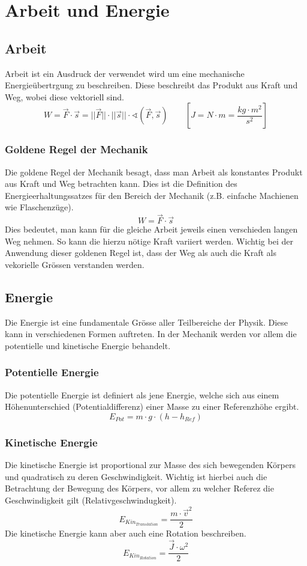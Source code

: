 \chapter{Arbeit und Energie}

\section{Arbeit}
Arbeit ist ein Ausdruck der verwendet wird um eine mechanische 
Energieübertrgung zu beschreiben. Diese beschreibt das Produkt aus
Kraft und Weg, wobei diese vektoriell sind.
\[ \boxed{ W = \vec{F} \cdot \vec{s} 
	= ||\vec{F}|| \cdot ||\vec{s}|| \cdot 
	\sphericalangle \left( \vec{F}, \vec{s} \right) } 
	\qquad \left[ J = N \cdot m = \frac{kg \cdot m^2}{s^2} \right] \]

\subsection{Goldene Regel der Mechanik}
Die goldene Regel der Mechanik besagt, dass man Arbeit als konstantes 
Produkt aus Kraft und Weg betrachten kann. Dies ist die Definition des
Energieerhaltungssatzes für den Bereich der Mechanik (z.B. einfache
Machienen wie Flaschenzüge). 
\[ \boxed{W = \vec{F} \cdot \vec{s}} \] 
Dies bedeutet, man kann für die gleiche Arbeit jeweils einen verschieden
langen Weg nehmen. So kann die hierzu nötige Kraft variiert werden. 
Wichtig bei der Anwendung dieser goldenen Regel ist, dass der Weg als
auch die Kraft als vekorielle Grössen verstanden werden. 

\section{Energie}
Die Energie ist eine fundamentale Grösse aller Teilbereiche der Physik.
Diese kann in verschiedenen Formen auftreten. In der Mechanik werden vor
allem die potentielle und kinetische Energie behandelt.

\subsection{Potentielle Energie}
Die potentielle Energie ist definiert als jene Energie, welche sich aus
einem Höhenunterschied (Potentialdifferenz) einer Masse zu einer 
Referenzhöhe ergibt. 
\[ \boxed{ E_{Pot} = m \cdot g \cdot (h - h_{Ref}) } \]

\subsection{Kinetische Energie}
Die kinetische Energie ist proportional zur Masse des sich bewegenden Körpers
und quadratisch zu deren Geschwindigkeit. Wichtig ist hierbei auch die 
Betrachtung der Bewegung des Körpers, vor allem zu welcher Referez die 
Geschwindigkeit gilt (Relativgeschwindugkeit).
\[ \boxed{ E_{Kin_{Translation}} = \frac{m \cdot \vec{v}^2}{2} } \]
Die kinetische Energie kann aber auch eine Rotation beschreiben.
\[ \boxed{ E_{Kin_{Rotation}} = \frac{\vec{J} \cdot \omega^2}{2} } \]

